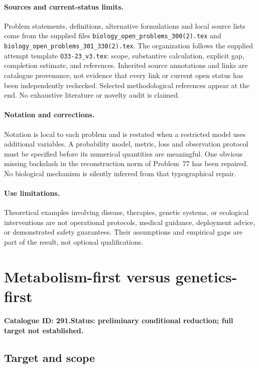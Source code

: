 \documentclass[11pt]{article}
\begin{document}
\paragraph{Sources and current-status limits.}
Problem statements, definitions, alternative formulations and local source lists
come from the supplied files
\texttt{biology\_open\_problems\_300(2).tex} and
\texttt{biology\_open\_problems\_301\_330(2).tex}.
The organization follows the supplied attempt template
\texttt{O33-23\_v3.tex}: scope, substantive calculation, explicit gap,
completion estimate, and references. Inherited source annotations and links are
catalogue provenance, not evidence that every link or current open status has
been independently rechecked. Selected methodological references appear at the
end. No exhaustive literature or novelty audit is claimed.

\paragraph{Notation and corrections.}
Notation is local to each problem and is restated when a restricted model uses
additional variables. A probability model, metric, loss and observation protocol
must be specified before its numerical quantities are meaningful. One obvious
missing backslash in the reconstruction norm of Problem~77 has been repaired.
No biological mechanism is silently inferred from that typographical repair.

\paragraph{Use limitations.}
Theoretical examples involving disease, therapies, genetic systems, or ecological
interventions are not operational protocols, medical guidance, deployment advice,
or demonstrated safety guarantees. Their assumptions and empirical gaps are part
of the result, not optional qualifications.

\setcounter{section}{290}
\section{Metabolism-first versus genetics-first}
\label{prob:291}
\noindent\textbf{Catalogue ID: 291.}\quad \textbf{Status: preliminary conditional reduction; full target not established.}
\subsection{Target and scope}
\end{document}

